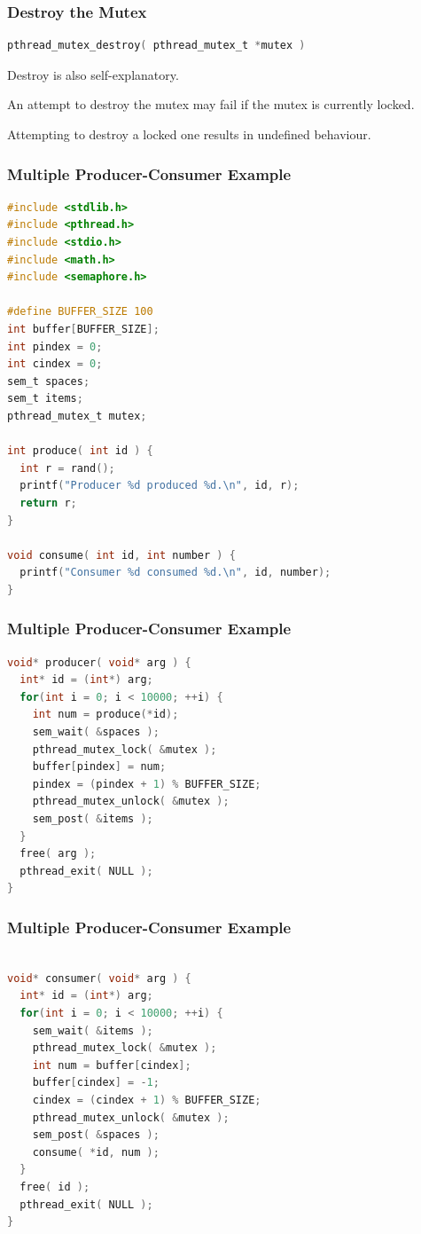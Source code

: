 \begin{frame}[fragile]
\frametitle{Destroy the Mutex}

\begin{lstlisting}[language=C]
pthread_mutex_destroy( pthread_mutex_t *mutex )
\end{lstlisting}

Destroy is also self-explanatory.

An attempt to destroy the mutex may fail if the mutex is currently locked. 

Attempting to destroy a locked one results in undefined behaviour.

\end{frame}


\begin{frame}[fragile]
\frametitle{Multiple Producer-Consumer Example}
\begin{lstlisting}[language=C]
#include <stdlib.h>
#include <pthread.h>
#include <stdio.h>
#include <math.h>
#include <semaphore.h>

#define BUFFER_SIZE 100
int buffer[BUFFER_SIZE];
int pindex = 0;
int cindex = 0;
sem_t spaces;
sem_t items;
pthread_mutex_t mutex;

int produce( int id ) {
  int r = rand();
  printf("Producer %d produced %d.\n", id, r);
  return r;
}

void consume( int id, int number ) {
  printf("Consumer %d consumed %d.\n", id, number);
}
\end{lstlisting}
\end{frame}

\begin{frame}[fragile]
\frametitle{Multiple Producer-Consumer Example}
\begin{lstlisting}[language=C]
void* producer( void* arg ) {
  int* id = (int*) arg;
  for(int i = 0; i < 10000; ++i) {
    int num = produce(*id); 
    sem_wait( &spaces );
    pthread_mutex_lock( &mutex );
    buffer[pindex] = num;
    pindex = (pindex + 1) % BUFFER_SIZE;
    pthread_mutex_unlock( &mutex );
    sem_post( &items );
  }
  free( arg );
  pthread_exit( NULL );
}
\end{lstlisting}
\end{frame}

\begin{frame}[fragile]
\frametitle{Multiple Producer-Consumer Example}
\begin{lstlisting}[language=C]

void* consumer( void* arg ) {
  int* id = (int*) arg;
  for(int i = 0; i < 10000; ++i) {
    sem_wait( &items );
    pthread_mutex_lock( &mutex );
    int num = buffer[cindex];
    buffer[cindex] = -1;
    cindex = (cindex + 1) % BUFFER_SIZE;
    pthread_mutex_unlock( &mutex );
    sem_post( &spaces );
    consume( *id, num );
  }
  free( id );
  pthread_exit( NULL );
}
\end{lstlisting}
\end{frame}

